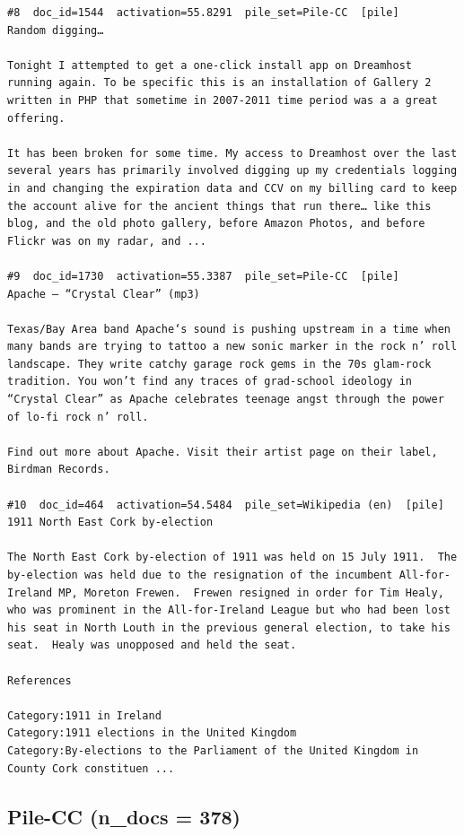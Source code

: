 \begin{verbatim}
#8  doc_id=1544  activation=55.8291  pile_set=Pile-CC  [pile]
Random digging…

Tonight I attempted to get a one-click install app on Dreamhost running again. To be specific this is an installation of Gallery 2 written in PHP that sometime in 2007-2011 time period was a a great offering.

It has been broken for some time. My access to Dreamhost over the last several years has primarily involved digging up my credentials logging in and changing the expiration data and CCV on my billing card to keep the account alive for the ancient things that run there… like this blog, and the old photo gallery, before Amazon Photos, and before Flickr was on my radar, and ...

#9  doc_id=1730  activation=55.3387  pile_set=Pile-CC  [pile]
Apache – “Crystal Clear” (mp3)

Texas/Bay Area band Apache‘s sound is pushing upstream in a time when many bands are trying to tattoo a new sonic marker in the rock n’ roll landscape. They write catchy garage rock gems in the 70s glam-rock tradition. You won’t find any traces of grad-school ideology in “Crystal Clear” as Apache celebrates teenage angst through the power of lo-fi rock n’ roll.

Find out more about Apache. Visit their artist page on their label, Birdman Records.

#10  doc_id=464  activation=54.5484  pile_set=Wikipedia (en)  [pile]
1911 North East Cork by-election

The North East Cork by-election of 1911 was held on 15 July 1911.  The by-election was held due to the resignation of the incumbent All-for-Ireland MP, Moreton Frewen.  Frewen resigned in order for Tim Healy, who was prominent in the All-for-Ireland League but who had been lost his seat in North Louth in the previous general election, to take his seat.  Healy was unopposed and held the seat.

References

Category:1911 in Ireland
Category:1911 elections in the United Kingdom
Category:By-elections to the Parliament of the United Kingdom in County Cork constituen ...

\end{verbatim}

\subsection*{Pile-CC (n\_docs = 378)}

